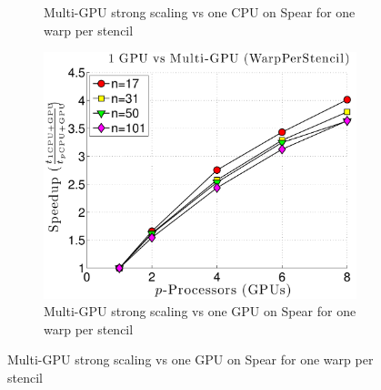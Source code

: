 \begin{figure}[htbp]
\begin{subfigure}[b]{0.425\textwidth}
\caption{Multi-GPU strong scaling vs one CPU on Spear for one warp per stencil}
\label{fig:alltoall_multigpu_vs_cpu_scaling}
\end{subfigure} 
\begin{subfigure}[b]{0.425\textwidth}
\centering
\includegraphics[width=1.0\textwidth]{../figures/spear_results/vortex/speedup_1GPU_vs_NGPU_WarpPerStencil-eps-converted-to.pdf}
\caption{Multi-GPU strong scaling vs one GPU on Spear for one warp per stencil}
\label{fig:alltoall_multigpu_vs_gpu_scaling}
\end{subfigure} 
\end{figure} 






